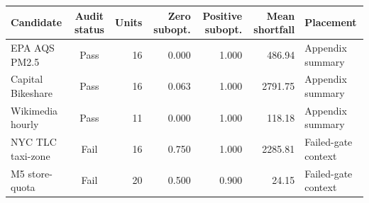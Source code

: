 \begin{tabular}{lcrrrrl}
\toprule
Candidate & Audit status & Units & Zero subopt. & Positive subopt. & Mean shortfall & Placement \\
\midrule
EPA AQS PM2.5 & Pass & 16 & 0.000 & 1.000 & 486.94 & Appendix summary \\
Capital Bikeshare & Pass & 16 & 0.063 & 1.000 & 2791.75 & Appendix summary \\
Wikimedia hourly & Pass & 11 & 0.000 & 1.000 & 118.18 & Appendix summary \\
NYC TLC taxi-zone & Fail & 16 & 0.750 & 1.000 & 2285.81 & Failed-gate context \\
M5 store-quota & Fail & 20 & 0.500 & 0.900 & 24.15 & Failed-gate context \\
\bottomrule
\end{tabular}
